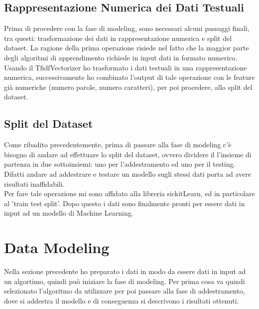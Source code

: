 \documentclass[]{article}
\begin{document}
        \subsection{Rappresentazione Numerica dei Dati Testuali}
            Prima di procedere con la fase di modeling, sono necessari alcuni passaggi finali, tra questi: trasformazione dei dati in rappresentazione numerica e split del dataset. La ragione della prima operazione risiede nel fatto che la maggior parte degli algoritmi di apprendimento richiede in input dati in formato numerico.\\
            Usando il TfidfVectorizer ho trasformato i dati testuali in una rappresentazione numerica, successivamente ho combinato l'output di tale operazione con le feature già numeriche (numero parole, numero caratteri), per poi procedere, allo split del dataset.

        \subsection{Split del Dataset}
            Come ribadito precedentemente, prima di passare alla fase di modeling c'è bisogno di andare ad effettuare lo split del dataset, ovvero dividere il l'insieme di partenza in due sottoinsiemi: uno per l'addestramento ed uno per il testing. Difatti andare ad addestrare e testare un modello sugli stessi dati porta ad avere risultati inaﬃdabili.\\
            Per fare tale operazione mi sono affidato alla libreria sickitLearn, ed in particolare al 'train test split'.
            Dopo questo i dati sono finalmente pronti per essere dati in input ad un modello di Machine Learning.

        \newpage
        \section{Data Modeling}
            Nella sezione precedente ho preparato i dati in modo da essere dati in input ad un algortimo, quindi può iniziare la fase di modeling. Per prima cosa va quindi selezionato l’algoritmo da
            utilizzare per poi passare alla fase di addestramento, dove si addestra il modello e di conseguenza si descrivono i risultati ottenuti.
\end{document}
